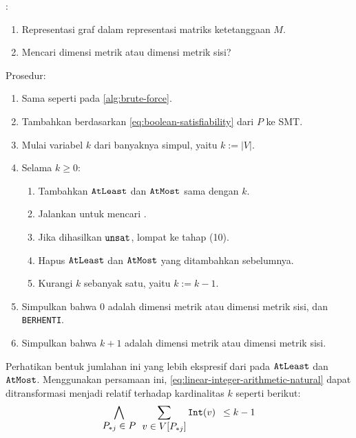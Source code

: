 \begin{algorithm}[H]
	:
	\begin{enumerate}
		\item Representasi graf dalam representasi matriks ketetanggaan \(M\).
		\item Mencari dimensi metrik atau dimensi metrik sisi?
	\end{enumerate}
	Prosedur:
	\begin{enumerate}
		\item[1--5.] Sama seperti pada \autoref{alg:brute-force}.
		\setcounter{enumi}{5}
		\item Tambahkan  berdasarkan \autoref{eq:boolean-satisfiability} dari \(P\) ke  SMT.
		\item Mulai variabel \(k\) dari banyaknya simpul, yaitu \(k := |V|\).
		\item Selama \(k \geq 0\):
			\begin{enumerate}
					\item Tambahkan  \(\mathtt{AtLeast}\) dan \(\mathtt{AtMost}\) sama dengan \(k\).
					\item Jalankan  untuk mencari .
					\item Jika dihasilkan \(\mathtt{unsat}\), lompat ke tahap (10).
					\item Hapus  \(\mathtt{AtLeast}\) dan \(\mathtt{AtMost}\) yang ditambahkan sebelumnya.
					\item Kurangi \(k\) sebanyak satu, yaitu \(k := k - 1\).
			\end{enumerate}
		\item Simpulkan bahwa 0 adalah dimensi metrik atau dimensi metrik sisi, dan \texttt{BERHENTI}.
		\item Simpulkan bahwa \(k + 1\) adalah dimensi metrik atau dimensi metrik sisi.
	\end{enumerate}
	\caption{}
	\label{alg:boolean-satisfiability}
\end{algorithm}

Perhatikan bentuk jumlahan ini yang lebih ekspresif dari pada \(\mathtt{AtLeast}\) dan \(\mathtt{AtMost}\). Menggunakan persamaan ini, \autoref{eq:linear-integer-arithmetic-natural} dapat ditransformasi menjadi relatif terhadap kardinalitas \(k\) seperti berikut:
\begin{equation}
	\bigwedge \limits_{\displaystyle P_{*j} \in P} \enspace \sum \limits_{\displaystyle v \in V[P_{*j}]} \mathtt{Int}(v) \enspace \leq k - 1
	\label{eq:linear-integer-arithmetic}
\end{equation}

